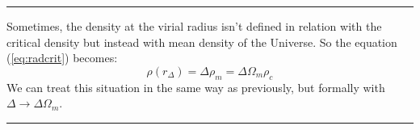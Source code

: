 \noindent\rule{\linewidth}{1pt}
%
Sometimes, the density at the virial radius isn't defined in relation with the
critical density but instead with mean density of the Universe. So the equation
(\ref{eq:radcrit}) becomes:
%
\begin{equation}
	\rho\left({r_\Delta}\right)=\Delta\rho_m=\Delta{\Omega_m}\rho_c
\end{equation}
%
We can treat this situation in the same way as previously, but formally with
$\Delta\rightarrow\Delta\Omega_m$.

\noindent\rule{\linewidth}{1pt}
